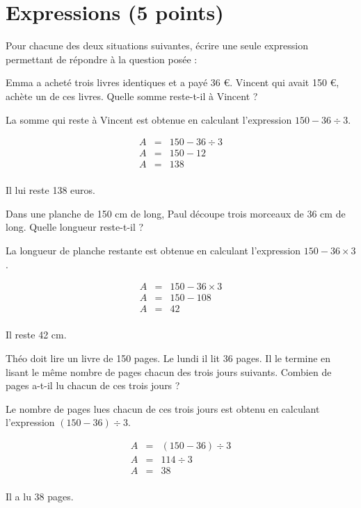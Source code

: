 \section{Expressions (5 points)}

Pour chacune des deux situations suivantes, écrire une seule expression permettant de répondre à la question posée :

\begin{questions}
	\question[1\half] Emma a acheté trois livres identiques et a payé 36 €. Vincent qui avait 150 €, achète un de ces livres. Quelle somme reste-t-il à Vincent ?
	
	\begin{solution}
		La somme qui reste à Vincent est obtenue en calculant l'expression $150 - 36 \div 3 $.
		
		\begin{eqnarray*}
		 	A &=& 150 - 36 \div 3 \\
		 	A &=& 150 - 12 \\
		 	A &=& 138 \\
		\end{eqnarray*}
	
		Il  lui reste 138 euros.
	\end{solution}
	
	\question[1\half] Dans une planche de 150 cm de long, Paul découpe trois morceaux de 36 cm de long. Quelle longueur reste-t-il ?
	\begin{solution}
		La longueur de planche restante est obtenue en calculant l'expression $150 - 36 \times 3 $.
		
		\begin{eqnarray*}
			A &=& 150 - 36 \times 3 \\
			A &=& 150 - 108 \\
			A &=& 42 \\
		\end{eqnarray*}
		
		Il  reste 42 cm.
	\end{solution}
	
	\question[2] Théo doit lire un livre de 150 pages. Le lundi il lit 36 pages. Il le termine en lisant le même nombre de pages chacun des trois jours suivants. Combien de pages a-t-il lu chacun de ces trois jours ?
	\begin{solution}
		Le nombre de pages lues chacun de ces trois jours est obtenu en calculant l'expression $(150 - 36) \div 3 $.
		
		\begin{eqnarray*}
			A &=& (150 - 36) \div 3 \\
			A &=& 114 \div 3 \\
			A &=& 38 \\
		\end{eqnarray*}
		
		Il  a lu 38 pages.
	\end{solution}
\end{questions}